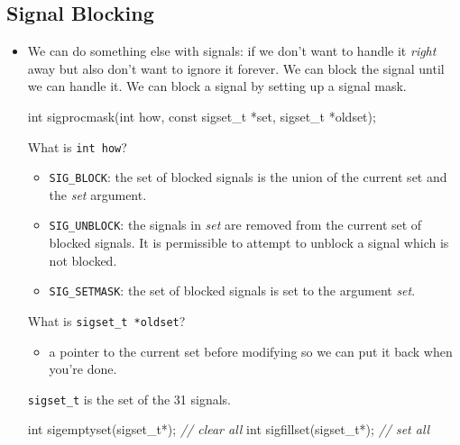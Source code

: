 \documentclass[]{article}
\newenvironment{Shaded}{}{}
\newcommand{\DataTypeTok}[1]{\textcolor[rgb]{0.56,0.13,0.00}{#1}}
\newcommand{\CommentTok}[1]{\textcolor[rgb]{0.38,0.63,0.69}{\textit{#1}}}
\newcommand{\NormalTok}[1]{#1}
\begin{document}
\subsection{\texorpdfstring{\textbf{Signal
Blocking}}{Signal Blocking}}\label{header-n542}

\begin{itemize}
\item
  We can do something else with signals: if we don't want to handle it
  \emph{right} away but also don't want to ignore it forever. We can
  block the signal until we can handle it. We can block a signal by
  setting up a signal mask.

\begin{Shaded}
\begin{Highlighting}[]
\DataTypeTok{int}\NormalTok{ sigprocmask(}\DataTypeTok{int}\NormalTok{ how, }\DataTypeTok{const}\NormalTok{ sigset_t *set, sigset_t *oldset);}
\end{Highlighting}
\end{Shaded}

  What is \texttt{int\ how}?

  \begin{itemize}
  \item
    \texttt{SIG\_BLOCK}: the set of blocked signals is the union of the
    current set and the \emph{set} argument.
  \item
    \texttt{SIG\_UNBLOCK}: the signals in \emph{set} are removed from
    the current set of blocked signals. It is permissible to attempt to
    unblock a signal which is not blocked.
  \item
    \texttt{SIG\_SETMASK}: the set of blocked signals is set to the
    argument \emph{set}.
  \end{itemize}

  What is \texttt{sigset\_t\ *oldset}?

  \begin{itemize}
  \item
    a pointer to the current set before modifying so we can put it back
    when you're done.
  \end{itemize}

  \texttt{sigset\_t} is the set of the 31 signals.

\begin{Shaded}
\begin{Highlighting}[]
\DataTypeTok{int}\NormalTok{ sigemptyset(sigset_t*); 	}\CommentTok{// clear all}
\DataTypeTok{int}\NormalTok{ sigfillset(sigset_t*);		}\CommentTok{// set all}
\end{Highlighting}
\end{Shaded}
\end{itemize}
\end{document}

